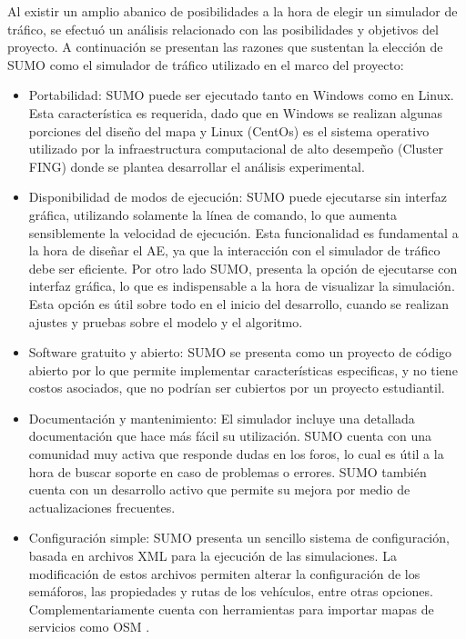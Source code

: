 Al existir un amplio abanico de posibilidades a la hora de elegir un simulador de tráfico, se efectuó un análisis relacionado con las posibilidades y objetivos del proyecto. A continuación se presentan las razones que sustentan la elección de SUMO como el simulador de tráfico utilizado en el marco del proyecto:

\begin{itemize}
	\item Portabilidad: SUMO puede ser ejecutado tanto en Windows como en Linux. Esta característica es requerida, dado que en Windows se realizan algunas porciones del diseño del mapa y Linux (CentOs) es el sistema operativo utilizado por la infraestructura computacional de alto desempeño (Cluster FING) donde se plantea desarrollar el análisis experimental.
	
	\item Disponibilidad de modos de ejecución: SUMO puede ejecutarse sin interfaz gráfica, utilizando solamente la línea de comando, lo que aumenta sensiblemente la velocidad de ejecución. Esta funcionalidad es fundamental a la hora de diseñar el AE, ya que la interacción con el simulador de tráfico debe ser eficiente. Por otro lado SUMO, presenta la opción de ejecutarse con interfaz gráfica, lo que es indispensable a la hora de visualizar la simulación. Esta opción es útil sobre todo en el inicio del desarrollo, cuando se realizan ajustes y pruebas sobre el modelo y el algoritmo.
	
	\item Software gratuito y abierto: SUMO se presenta como un proyecto de código abierto por lo que permite implementar características especificas, y no tiene costos asociados, que no podrían ser cubiertos por un proyecto estudiantil. 
	
	\item Documentación y mantenimiento: El simulador incluye una detallada documentación que hace más fácil su utilización. SUMO cuenta con una comunidad muy activa que responde dudas en los foros, lo cual es útil a la hora de buscar soporte en caso de problemas o errores. SUMO también cuenta con un desarrollo activo que permite su mejora por medio de actualizaciones frecuentes.
	
	\item Configuración simple: SUMO presenta un sencillo sistema de configuración, basada en archivos XML para la ejecución de las simulaciones. La modificación de estos archivos permiten alterar la configuración de los semáforos, las propiedades y rutas de los vehículos, entre otras opciones. Complementariamente cuenta con herramientas para importar mapas de servicios como OSM \citep{OSM}.
	

\end{itemize}
